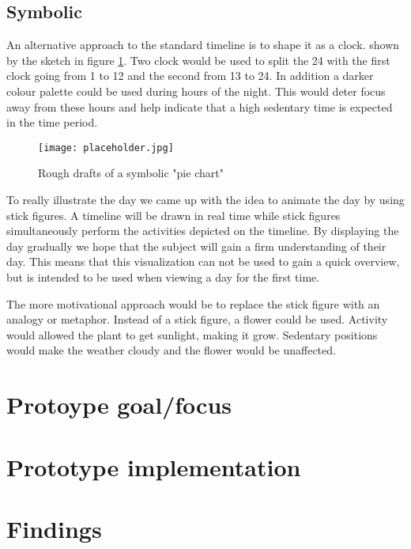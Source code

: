 \subsection{Symbolic}
An alternative approach to the standard timeline is to shape it as a clock. shown by the sketch in figure \ref{fig:clock}. Two clock would be used to split the 24 with the first clock going from 1 to 12 and the second from 13 to 24. In addition a darker colour palette could be used during hours of the night. This would deter focus away from these hours and help indicate that a high sedentary time is expected in the time period.

\begin{figure}[h!]
	\centering
		\texttt{[image: placeholder.jpg]}
		\caption{\footnotesize Rough drafts of a symbolic "pie chart"}
		\label{fig:clock}
\end{figure}

To really illustrate the day we came up with the idea to animate the day by using stick figures. A timeline will be drawn in real time while stick figures simultaneously perform the activities depicted on the timeline. By displaying the day gradually we hope that the subject will gain a firm understanding of their day. This means that this visualization can not be used to gain a quick overview, but is intended to be used when viewing a day for the first time.

The more motivational approach would be to replace the stick figure with an analogy or metaphor. Instead of a stick figure, a flower could be used. Activity would allowed the plant to get sunlight, making it grow. Sedentary positions would make the weather cloudy and the flower would be unaffected.



\section{Protoype goal/focus}

\section{Prototype implementation}

\section{Findings}